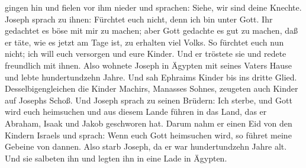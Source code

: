 gingen hin und fielen vor ihm nieder und sprachen: Siehe, wir sind deine
Knechte.  Joseph sprach zu ihnen: Fürchtet euch nicht, denn
ich bin unter Gott.  Ihr gedachtet es böse mit mir zu
machen; aber Gott gedachte es gut zu machen, daß er täte, wie es jetzt
am Tage ist, zu erhalten viel Volks.  So fürchtet euch nun
nicht; ich will euch versorgen und eure Kinder. Und er tröstete sie und
redete freundlich mit ihnen.  Also wohnete Joseph in
Ägypten mit seines Vaters Hause und lebte hundertundzehn Jahre.
 Und sah Ephraims Kinder bis ins dritte Glied.
Desselbigengleichen die Kinder Machirs, Manasses Sohnes, zeugeten auch
Kinder auf Josephs Schoß.  Und Joseph sprach zu seinen
Brüdern: Ich sterbe, und Gott wird euch heimsuchen und aus diesem Lande
führen in das Land, das er Abraham, Isaak und Jakob geschworen hat.
 Darum nahm er einen Eid von den Kindern Israels und
sprach: Wenn euch Gott heimsuchen wird, so führet meine Gebeine von
dannen.  Also starb Joseph, da er war hundertundzehn Jahre
alt. Und sie salbeten ihn und legten ihn in eine Lade in Ägypten.
